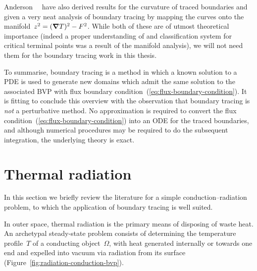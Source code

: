 Anderson~\etal~\cite{anderson-2007-boundary-tracing-i-theory}
have also derived results for the curvature of traced boundaries
and given a very neat analysis of boundary tracing
by mapping the curves onto the manifold~$z^2 = (\mathop{}\!\boldsymbol{\mathbf{\nabla}} T)^2 - F^2$.
While both of these are of utmost theoretical importance
(indeed a proper understanding of and classification system for
critical terminal points was a result of the manifold analysis),
we will not need them for the boundary tracing work in this thesis.

To summarise, boundary tracing is a method in which
a known solution to a PDE is used
to generate new domains which admit the same solution
to the associated BVP
with flux boundary condition~(\ref{eq:flux-boundary-condition}).
It is fitting to conclude this overview with the observation that
boundary tracing is \emph{not} a perturbative method.
No approximation is required
to convert the flux condition~(\ref{eq:flux-boundary-condition})
into an ODE for the traced boundaries,
and although numerical procedures may be required
to do the subsequent integration,
the underlying theory is exact.

\section{Thermal radiation}
\label{sec:introduction.radiation}

In this section
we briefly review the literature for
a simple conduction--radiation problem,
to which the application of boundary tracing is well suited.

In outer space,
thermal radiation is the primary means of disposing of waste heat.
An archetypal steady-state problem consists of
determining the temperature profile~$T$ of a conducting object~$\Omega$,
with heat generated internally or towards one end
and expelled into vacuum via radiation from its surface
(Figure~\ref{fig:radiation-conduction-bvp}).

\begin{figure}
\end{figure}


